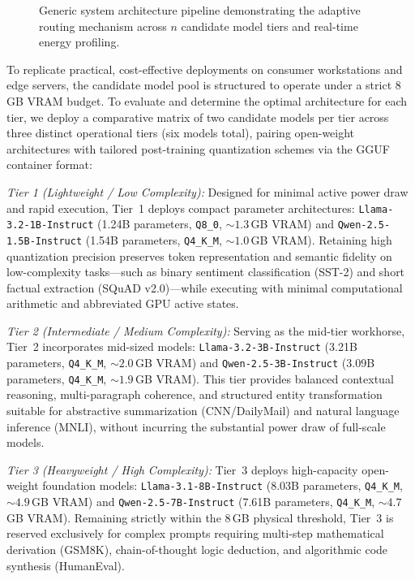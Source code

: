 \documentclass[runningheads]{llncs}
\begin{document}
\begin{figure}[htbp]
{%
}
\caption{Generic system architecture pipeline demonstrating the adaptive routing mechanism across $n$ candidate model tiers and real-time energy profiling.}
\label{fig:system-architecture}
\end{figure}

To replicate practical, cost-effective deployments on consumer workstations and edge servers, the candidate model pool is structured to operate under a strict 8\,GB VRAM budget. To evaluate and determine the optimal architecture for each tier, we deploy a comparative matrix of two candidate models per tier across three distinct operational tiers (six models total), pairing open-weight architectures with tailored post-training quantization schemes via the GGUF container format:

\emph{Tier 1 (Lightweight / Low Complexity):} Designed for minimal active power draw and rapid execution, Tier~1 deploys compact parameter architectures: \texttt{Llama-3.2-1B-Instruct} (1.24B parameters, \texttt{Q8\_0}, $\sim 1.3$\,GB VRAM) and \texttt{Qwen-2.5-1.5B-Instruct} (1.54B parameters, \texttt{Q4\_K\_M}, $\sim 1.0$\,GB VRAM). Retaining high quantization precision preserves token representation and semantic fidelity on low-complexity tasks---such as binary sentiment classification (SST-2) and short factual extraction (SQuAD v2.0)---while executing with minimal computational arithmetic and abbreviated GPU active states.

\emph{Tier 2 (Intermediate / Medium Complexity):} Serving as the mid-tier workhorse, Tier~2 incorporates mid-sized models: \texttt{Llama-3.2-3B-Instruct} (3.21B parameters, \texttt{Q4\_K\_M}, $\sim 2.0$\,GB VRAM) and \texttt{Qwen-2.5-3B-Instruct} (3.09B parameters, \texttt{Q4\_K\_M}, $\sim 1.9$\,GB VRAM). This tier provides balanced contextual reasoning, multi-paragraph coherence, and structured entity transformation suitable for abstractive summarization (CNN/DailyMail) and natural language inference (MNLI), without incurring the substantial power draw of full-scale models.

\emph{Tier 3 (Heavyweight / High Complexity):} Tier~3 deploys high-capacity open-weight foundation models: \texttt{Llama-3.1-8B-Instruct} (8.03B parameters, \texttt{Q4\_K\_M}, $\sim 4.9$\,GB VRAM) and \texttt{Qwen-2.5-7B-Instruct} (7.61B parameters, \texttt{Q4\_K\_M}, $\sim 4.7$\,GB VRAM). Remaining strictly within the 8\,GB physical threshold, Tier~3 is reserved exclusively for complex prompts requiring multi-step mathematical derivation (GSM8K), chain-of-thought logic deduction, and algorithmic code synthesis (HumanEval).
\end{document}
